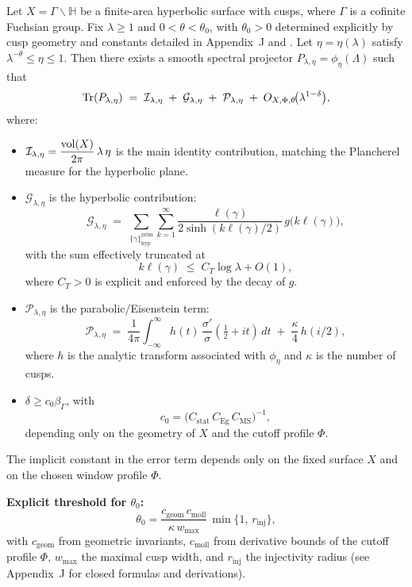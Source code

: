 \medskip

\begin{theorem}\label{thm:intro-localized-trace}
Let $X=\Gamma\backslash\mathbb{H}$ be a finite-area hyperbolic surface with cusps,
where $\Gamma$ is a cofinite Fuchsian group.
Fix $\lambda\ge 1$ and $0<\theta<\theta_0$, with $\theta_0>0$ determined explicitly
by cusp geometry and constants detailed in Appendix~J and .
Let $\eta=\eta(\lambda)$ satisfy $\lambda^{-\theta}\le \eta\le 1$.
Then there exists a smooth spectral projector $P_{\lambda,\eta}=\phi_\eta(\Lambda)$
such that
\[
  \operatorname{Tr}(P_{\lambda,\eta})
  \;=\;
  \mathcal{I}_{\lambda,\eta}
  \;+\;
  \mathcal{G}_{\lambda,\eta}
  \;+\;
  \mathcal{P}_{\lambda,\eta}
  \;+\;
  O_{X,\Phi,\theta}\!\big(\lambda^{1-\delta}\big),
\]
where:
\begin{itemize}
  \item $\mathcal{I}_{\lambda,\eta} = \dfrac{\operatorname{vol}(X)}{2\pi}\,\lambda\,\eta$
        is the main identity contribution, matching the Plancherel measure
        for the hyperbolic plane.
  \item $\mathcal{G}_{\lambda,\eta}$ is the hyperbolic contribution:
  \[
    \mathcal{G}_{\lambda,\eta}
    \;=\;
    \sum_{\{\gamma\}^{\mathrm{prim}}_{\mathrm{hyp}}}
    \sum_{k=1}^\infty
    \frac{\ell(\gamma)}{2\sinh(k\ell(\gamma)/2)}\,
    g\!\big(k\ell(\gamma)\big),
  \]
  with the sum effectively truncated at
  \[
    k\ell(\gamma)\;\leq\; C_T\log\lambda + O(1),
  \]
  where $C_T>0$ is explicit and enforced by the decay of $g$.
  \item $\mathcal{P}_{\lambda,\eta}$ is the parabolic/Eisenstein term:
  \[
    \mathcal{P}_{\lambda,\eta}
    \;=\;
    \frac{1}{4\pi}\int_{-\infty}^{\infty}
      h(t)\,\frac{\sigma'}{\sigma}(\tfrac{1}{2}+it)\,dt
    \;+\;
    \frac{\kappa}{4}\,h(i/2),
  \]
  where $h$ is the analytic transform associated with $\phi_\eta$
  and $\kappa$ is the number of cusps.
  \item $\delta \geq c_0 \beta_\Gamma$, with
        \[
          c_0 = \big(C_{\mathrm{stat}}\,C_{\mathrm{Eg}}\,C_{\mathrm{MS}}\big)^{-1},
        \]
        depending only on the geometry of $X$ and
        the cutoff profile $\Phi$.
\end{itemize}
The implicit constant in the error term depends only on the fixed surface $X$
and on the chosen window profile $\Phi$.

\noindent\textbf{Explicit threshold for $\theta_0$:}
\[
\theta_0 = \frac{c_{\mathrm{geom}}\,c_{\mathrm{moll}}}{\kappa\,w_{\max}}\,\min\{1,\,r_{\mathrm{inj}}\},
\]
with $c_{\mathrm{geom}}$ from geometric invariants,
$c_{\mathrm{moll}}$ from derivative bounds of the cutoff profile $\Phi$,
$w_{\max}$ the maximal cusp width, and $r_{\mathrm{inj}}$ the injectivity radius
(see Appendix~J for closed formulas and derivations).
\end{theorem}

